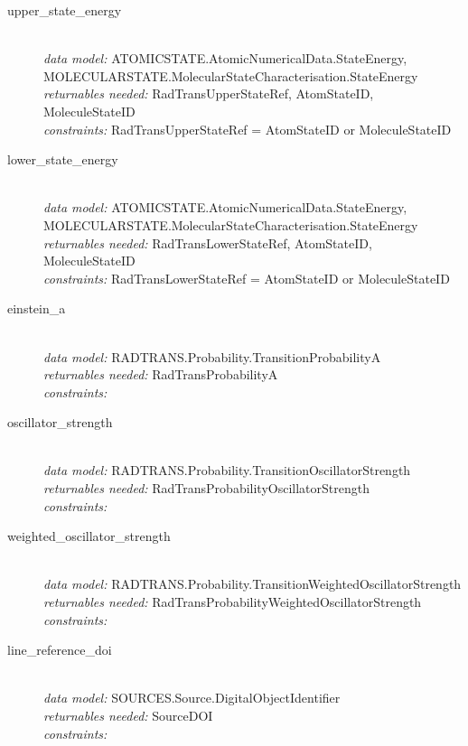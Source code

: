 \documentclass[11pt,a4paper]{ivoa}
\begin{document}
\begin{description}
	\item [upper\_state\_energy]\hfill\\
	\textit{data model:} ATOMICSTATE.AtomicNumericalData.StateEnergy, \\ MOLECULARSTATE.MolecularStateCharacterisation.StateEnergy\\
	\textit{returnables needed:} RadTransUpperStateRef, AtomStateID, MoleculeStateID\\
	\textit{constraints:}  RadTransUpperStateRef = AtomStateID or MoleculeStateID
	
	\item [lower\_state\_energy]\hfill\\
	\textit{data model:} ATOMICSTATE.AtomicNumericalData.StateEnergy, \\ MOLECULARSTATE.MolecularStateCharacterisation.StateEnergy\\
	\textit{returnables needed:} RadTransLowerStateRef, AtomStateID,  MoleculeStateID\\
	\textit{constraints:}  RadTransLowerStateRef = AtomStateID or MoleculeStateID

	\item [einstein\_a]\hfill\\
	\textit{data model:}  RADTRANS.Probability.TransitionProbabilityA\\
	\textit{returnables needed:} RadTransProbabilityA\\
	\textit{constraints:}

	\item [oscillator\_strength]\hfill\\
	\textit{data model:}  RADTRANS.Probability.TransitionOscillatorStrength\\
	\textit{returnables needed:} RadTransProbabilityOscillatorStrength\\
        \textit{constraints:}

	\item [weighted\_oscillator\_strength]\hfill\\
	\textit{data model:}  RADTRANS.Probability.TransitionWeightedOscillatorStrength\\
	\textit{returnables needed:} RadTransProbabilityWeightedOscillatorStrength\\
 	   \textit{constraints:}

	\item [line\_reference\_doi]\hfill\\
	\textit{data model:} SOURCES.Source.DigitalObjectIdentifier\\
	\textit{returnables needed:} SourceDOI\\
	\textit{constraints:}


\end{description}
\end{document}
